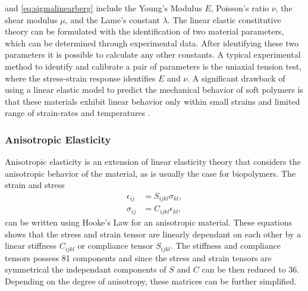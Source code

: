 and \ref{eq:sigmalinearberg} include the Young's Modulus $E$, Poisson's ratio $\nu$, the shear modulus $\mu$, 
and the Lame's constant $\lambda$. 
The linear elastic constitutive theory can be formulated with the identification of two material parameters,
which can be determined through experimental data. After identifying these two parameters it is possible to  
calculate any other constants. A typical experimental method to identify and calibrate a pair of parameters is the uniaxial tension 
test, where the stress-strain response identifies $E$ and $\nu$.
A significant drawback of using a linear elastic model to predict the mechanical behavior of soft polymers is 
that these materials exhibit linear behavior only within small strains and limited range of strain-rates and 
temperatures \cite{Bergström2015}. 

\subsubsection*{Anisotropic Elasticity}
Anisotropic elasticity is an extension of linear elasticity theory that considers the anisotropic 
behavior of the material, as is usually the case for biopolymers. The strain and stress 
\begin{align}
        \epsilon_{ij} &= S_{ijkl} \sigma_{kl}, \label{eq:strainanisotropic}\\
        \sigma_{ij} &= C_{ijkl} \epsilon_{kl}, \label{eq:stressanisotropic}
\end{align}
can be written using Hooke's Law for an anisotropic material. These equations 
shows that the stress and strain tensor are linearly dependant on each other by a linear stiffness $C_{ijkl}$ 
or compliance tensor $S_{ijkl}$. The stiffness and compliance tensors possess \SI{81}{} components and 
since the stress and strain tensors are symmetrical the independant components of $S$ and $C$ can be then reduced 
to \SI{36}{}. Depending on the degree of anisotropy, these matrices can be further simplified. 






